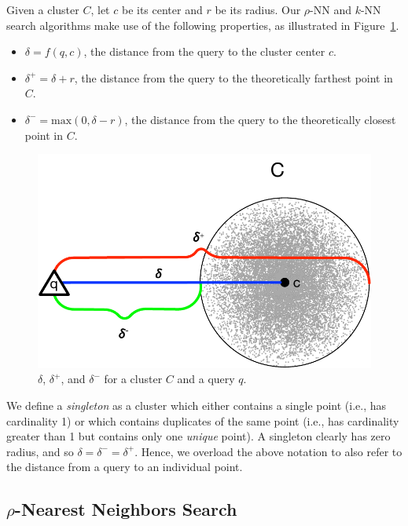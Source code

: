 Given a cluster $C$, let $c$ be its center and $r$ be its radius.
Our $\rho$-NN and $k$-NN search algorithms make use of the following properties, as illustrated in Figure~\ref{fig:methods:deltas}.

\begin{itemize}
    \item $\delta = f(q, c)$, the distance from the query to the cluster center $c$.
    \item $\delta^{+} = \delta + r$, the distance from the query to the theoretically farthest point in $C$.
    \item $\delta^{-} = \text{max}(0, \delta - r)$, the distance from the query to the theoretically closest point in $C$.
\end{itemize}

\begin{figure}[ht!]
    \centering
    \includegraphics[scale=0.8]{images/geometry/deltas.pdf}
    \caption{{\color{blue}$\delta$}, {\color{red}$\delta^{+}$}, and {\color{green}$\delta^{-}$} for a cluster $C$ and a query $q$.}
    \label{fig:methods:deltas}
\end{figure}

We define a \textit{singleton} as a cluster which either contains a single point (i.e., has cardinality 1) or which contains duplicates of the same point (i.e., has cardinality greater than 1 but contains only one \textit{unique} point).
A singleton clearly has zero radius, and so $\delta = \delta^{-} = \delta^{+}$.
Hence, we overload the above notation to also refer to the distance from a query to an individual point.


\subsection{\texorpdfstring{$\rho$}{p}-Nearest Neighbors Search}
\label{sec:methods:rnn-search}

